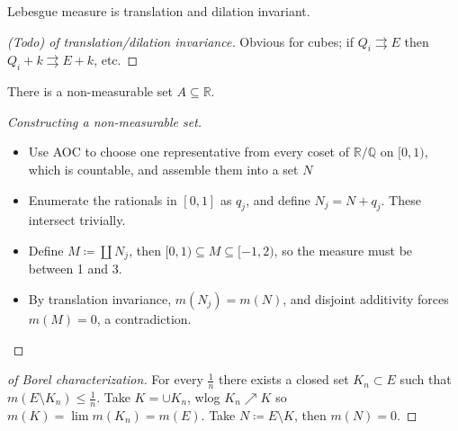 \begin{proposition}

Lebesgue measure is translation and dilation invariant.

\end{proposition}

\begin{proof}[(Todo) of translation/dilation invariance]

Obvious for cubes; if \(Q_{i} \rightrightarrows E\) then
\(Q_{i} + k \rightrightarrows E + k\), etc.

\end{proof}

\begin{theorem}

There is a non-measurable set \(A\subseteq {\mathbb{R}}\).

\end{theorem}

\begin{proof}[Constructing a non-measurable set]

\envlist

\begin{itemize}
\tightlist
\item
  Use AOC to choose one representative from every coset of
  \({\mathbb{R}}/{\mathbb{Q}}\) on \([0, 1)\), which is countable, and
  assemble them into a set \(N\)
\item
  Enumerate the rationals in \([0, 1]\) as \(q_{j}\), and define
  \(N_{j} = N + q_{j}\). These intersect trivially.
\item
  Define \(M \coloneqq{\textstyle\coprod}N_{j}\), then
  \([0, 1) \subseteq M \subseteq [-1, 2)\), so the measure must be
  between 1 and 3.
\item
  By translation invariance, \(m(N_{j}) = m(N)\), and disjoint
  additivity forces \(m(M) = 0\), a contradiction.
\end{itemize}

\end{proof}

\begin{proof}[of Borel characterization]

For every \(\frac 1 n\) there exists a closed set \(K_{n} \subset E\)
such that \(m(E\setminus K_{n}) \leq \frac 1 n\). Take
\(K = \cup K_{n}\), wlog \(K_{n} \nearrow K\) so
\(m(K) = \lim m(K_{n}) = m(E)\). Take \(N\coloneqq E\setminus K\), then
\(m(N) = 0\).

\end{proof}

